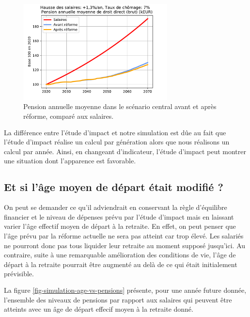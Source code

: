 \documentclass[10pt]{article}
\begin{document}
\begin{figure}
\begin{center}
\includegraphics[width=0.7\textwidth]{Simulation-pension-vs-salaires-3.pdf}
\end{center}
\caption{Pension annuelle moyenne dans le scénario central 
avant et après réforme, comparé aux salaires.}
\label{fig-pension-annuelle-avant-apres-salaires}
\end{figure}

La différence entre l'étude d'impact et notre simulation est dûe au fait que 
l'étude d'impact réalise un calcul par génération alors que nous réalisons un calcul 
par année. 
Ainsi, en changeant d'indicateur, l'étude d'impact peut montrer une situation 
dont l'apparence est favorable. 


\subsection{Et si l'âge moyen de départ était modifié ?}

On peut se demander ce qu'il adviendrait en conservant la règle d'équilibre 
financier et le niveau de dépenses prévu par l'étude d'impact 
mais en laissant varier l'âge effectif moyen de départ à la retraite. 
En effet, on peut penser que l'âge prévu par la réforme actuelle 
ne sera pas atteint car trop élevé. 
Les salariés ne pourront donc pas tous liquider leur retraite au moment
supposé jusqu'ici. 
Au contraire, suite à une remarquable amélioration des conditions de vie, 
l'âge de départ à la retraite pourrait être augmenté au delà de ce qui 
était initialement prévisible. 

La figure \ref{fig-simulation-age-vs-pensions} présente, pour une année future donnée, 
l'ensemble des niveaux de pensions par rapport aux salaires qui peuvent être atteints avec 
un âge de départ effecif moyen à la retraite donné. 
\end{document}

